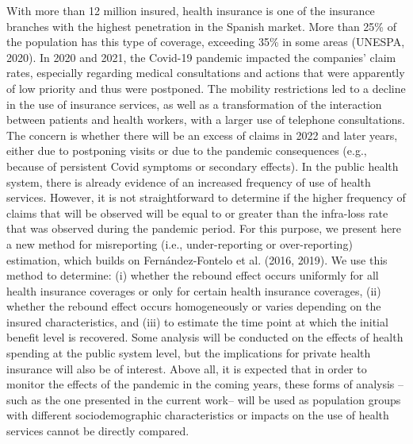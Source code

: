 \documentclass[12pt,twoside, A4paper]{article}
\begin{document}
With more than 12 million insured, health insurance is one of the insurance branches with the highest penetration in the Spanish market. More than 25\% of the population has this type of coverage, exceeding 35\% in some areas (UNESPA, 2020). In 2020 and 2021, the Covid-19 pandemic impacted the companies' claim rates, especially regarding medical consultations and actions that were apparently of low priority and thus were postponed. The mobility restrictions led to a decline in the use of insurance services, as well as a transformation of the interaction between patients and health workers, with a larger use of telephone consultations. The concern is whether there will be an excess of claims in 2022 and later years, either due to postponing visits or due to the pandemic consequences (e.g., because of persistent Covid symptoms or secondary effects). In the public health system, there is already evidence of an increased frequency of use of health services. However, it is not straightforward to determine if the higher frequency of claims that will be observed will be equal to or greater than the infra-loss rate that was observed during the pandemic period. For this purpose, we present here a new method for misreporting (i.e., under-reporting or over-reporting) estimation, which builds on Fernández-Fontelo et al. (2016, 2019). We use this method to determine: (i) whether the rebound effect occurs uniformly for all health insurance coverages or only for certain health insurance coverages, (ii) whether the rebound effect occurs homogeneously or varies depending on the insured characteristics, and (iii) to estimate the time point at which the initial benefit level is recovered. Some analysis will be conducted on the effects of health spending at the public system level, but the implications for private health insurance will also be of interest. Above all, it is expected that in order to monitor the effects of the pandemic in the coming years, these forms of analysis --such as the one presented in the current work-- will be used as population groups with different sociodemographic characteristics or impacts on the use of health services cannot be directly compared. 
\end{document}
